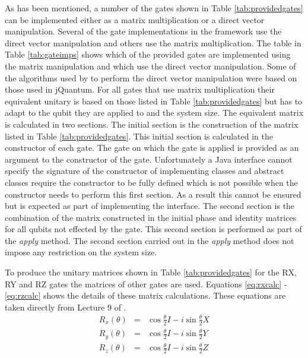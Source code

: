 As has been mentioned, a number of the gates shown in Table \ref{tab:providedgates} can be implemented either as a matrix multiplication or a direct vector manipulation.
Several of the gate implementations in the framework use the direct vector manipulation and others use the matrix multiplication.
The table in Table \ref{tab:gateimps} shows which of the provided gates are implemented using the matrix manipulation and which use the direct vector manipulation.
Some of the algorithms used by to perform the direct vector manipulation were based on those used in jQuantum\cite{jquantum}.
For all gates that use matrix multiplication their equivalent unitary is based on those listed in Table \ref{tab:providedgates} but has to adapt to the qubit they are applied to and the system size.
The equivalent matrix is calculated in two sections.
The initial section is the construction of the matrix listed in Table \ref{tab:providedgates}.
This initial section is calculated in the constructor of each gate.
The gate on which the gate is applied is provided as an argument to the constructor of the gate.
Unfortunately a Java interface cannot specify the signature of the constructor of implementing classes and abstract classes require the constructor to be fully defined which is not possible when the constructor needs to perform this first section.
As a result this cannot be ensured but is expected as part of implementing the interface.
The second section is the combination of the matrix constructed in the initial phase and identity matrices for all qubits not effected by the gate.
This second section is performed as part of the \emph{apply} method.
The second section carried out in the \emph{apply} method does not impose any restriction on the system size.

To produce the unitary matrices shown in Table \ref{tab:providedgates} for the RX, RY and RZ gates the matrices of other gates are used.
Equations \ref{eq:rxcalc} - \ref{eq:rzcalc} shows the details of these matrix calculations.
These equations are taken directly from Lecture 9 of \cite{QIPLect}.
\begin{eqnarray}
\label{eq:rxcalc}
 R_x(\theta)&=&\cos{\frac{\theta}{2}}I-i\sin{\frac{\theta}{2}}X \\
\label{eq:rycalc}
 R_y(\theta)&=&\cos{\frac{\theta}{2}}I-i\sin{\frac{\theta}{2}}Y \\
\label{eq:rzcalc}
 R_z(\theta)&=&\cos{\frac{\theta}{2}}I-i\sin{\frac{\theta}{2}}Z 
\end{eqnarray}

